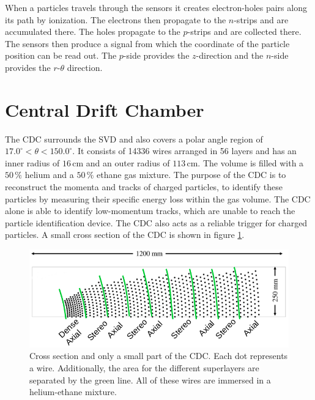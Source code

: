 \documentclass[a4paper,11pt,twosided,final,german,openbib,pdftex,listof=totoc,bibliography=totoc]{scrbook}
\begin{document}
When a particles travels through the sensors it creates electron-holes pairs along its path by ionization. The electrons then propagate to the $n$-strips and are accumulated there. The holes propagate to the $p$-strips and are collected there. The sensors then produce a signal from which the coordinate of the particle position can be read out. The $p$-side provides the $z$-direction and the $n$-side provides the $r$-$\theta$ direction.\cite{B2TR} \cite{bergauer2010silicon}



\section{Central Drift Chamber}
\label{sec:CDC}

The CDC surrounds the SVD and also covers a polar angle region of $17.0^{\circ} < \theta < 150.0^{\circ}$. It consists of 14336 wires arranged in 56 layers and has an inner radius of $16\,\textrm{cm}$ and an outer radius of $113\,\textrm{cm}$. The volume is filled with a $50\,\%$ helium and a $50\,\%$ ethane gas mixture. The purpose of the CDC is to reconstruct the momenta and tracks of charged particles, to identify these particles by measuring their specific energy loss within the gas volume. The CDC alone is able to identify low-momentum tracks, which are unable to reach the particle identification device. The CDC also acts as a reliable trigger for charged particles.\cite{B2TR} A small cross section of the CDC is shown in figure \ref{fig:CDC}.

\begin{figure}[h!] 
	\centering
	\includegraphics[width=\textwidth]{Bilder/CDC}
	\caption[Central Drift Chamber]{Cross section and only a small part of the CDC. Each dot represents a wire. Additionally, the area for the different superlayers are separated by the green line. All of these wires are immersed in a helium-ethane mixture.\cite{CDCHauth}}
	\label{fig:CDC}
\end{figure}
\end{document}
